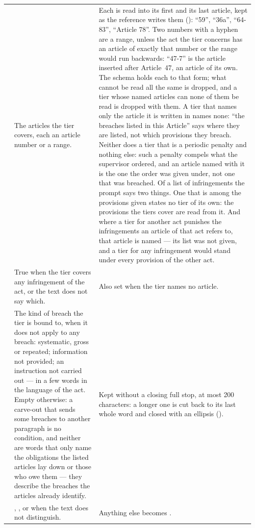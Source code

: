 \begin{xltabular}{\textwidth}{@{}L{27mm}YY@{}}
 & The articles the tier covers, each an article number or a range. & Each is read into its first and its last article, kept as the reference writes them (): \enquote{59}, \enquote{36a}, \enquote{64-83}, \enquote{Article 78}. Two numbers with a hyphen are a range, unless the act the tier concerns has an article of exactly that number or the range would run backwards: \enquote{47-7} is the article inserted after Article~47, an article of its own. The schema holds each to that form; what cannot be read all the same is dropped, and a tier whose named articles can none of them be read is dropped with them. A tier that names only the article it is written in names none: \enquote{the breaches listed in this Article} says where they are listed, not which provisions they breach. Neither does a tier that is a periodic penalty and nothing else: such a penalty compels what the supervisor ordered, and an article named with it is the one the order was given under, not one that was breached. Of a list of infringements the prompt says two things. One that is among the provisions given states no tier of its own: the provisions the tiers cover are read from it. And where a tier for another act punishes the infringements an article of that act refers to, that article is named --- its list was not given, and a tier for any infringement would stand under every provision of the other act. \\
 & True when the tier covers any infringement of the act, or the text does not say which. & Also set when the tier names no article. \\
 & The kind of breach the tier is bound to, when it does not apply to any breach: systematic, gross or repeated; information not provided; an instruction not carried out --- in a few words in the language of the act. Empty otherwise: a carve-out that sends some breaches to another paragraph is no condition, and neither are words that only name the obligations the listed articles lay down or those who owe them --- they describe the breaches the articles already identify. & Kept without a closing full stop, at most 200 characters: a longer one is cut back to its last whole word and closed with an ellipsis (). \\
 & , , or  when the text does not distinguish. & Anything else becomes . \\

\end{xltabular}
